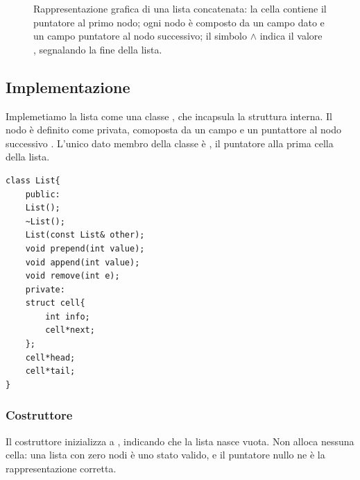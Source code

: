 \begin{figure}[h]
\begin{center}
\caption{Rappresentazione grafica di una lista concatenata: la cella  contiene il puntatore al primo nodo; ogni nodo è composto da un campo
  dato e un campo puntatore al nodo successivo; il simbolo $\wedge$ indica il valore , segnalando la fine della lista.}
  \label{fig:lista_semplice}
\end{center}
\end{figure}




\subsection{Implementazione}
Implemetiamo la lista come una classe , che incapsula la struttura interna. Il nodo è definito come 
privata, comoposta da un campo  e un puntattore al nodo successivo . L'unico dato membro della classe è 
, il puntatore alla prima cella della lista.  

\begin{codebox}
    \begin{lstlisting}
class List{
    public:
    List();
    ~List();
    List(const List& other);
    void prepend(int value);
    void append(int value);
    void remove(int e);
    private:
    struct cell{
        int info;
        cell*next;
    };
    cell*head;
    cell*tail;
}
    \end{lstlisting}
\end{codebox}

\subsubsection{Costruttore}
Il costruttore inizializza  a , indicando che la lista nasce vuota. Non alloca nessuna cella: una lista con zero nodi è uno stato valido, e il puntatore nullo ne è la rappresentazione corretta.

